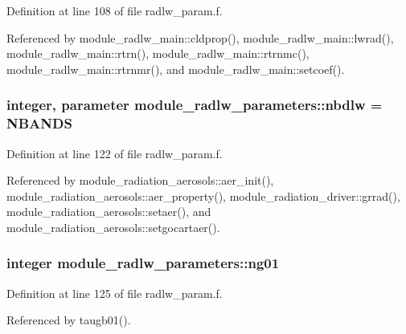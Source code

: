 Definition at line 108 of file radlw\+\_\+param.\+f.



Referenced by module\+\_\+radlw\+\_\+main\+::cldprop(), module\+\_\+radlw\+\_\+main\+::lwrad(), module\+\_\+radlw\+\_\+main\+::rtrn(), module\+\_\+radlw\+\_\+main\+::rtrnmc(), module\+\_\+radlw\+\_\+main\+::rtrnmr(), and module\+\_\+radlw\+\_\+main\+::setcoef().

\subsubsection[{\texorpdfstring{nbdlw}{nbdlw}}]{\setlength{\rightskip}{0pt plus 5cm}integer, parameter module\+\_\+radlw\+\_\+parameters\+::nbdlw = N\+B\+A\+N\+DS}\hypertarget{namespacemodule__radlw__parameters_a39a115a97296886b2e6e37b220e942c7}{}\label{namespacemodule__radlw__parameters_a39a115a97296886b2e6e37b220e942c7}


Definition at line 122 of file radlw\+\_\+param.\+f.



Referenced by module\+\_\+radiation\+\_\+aerosols\+::aer\+\_\+init(), module\+\_\+radiation\+\_\+aerosols\+::aer\+\_\+property(), module\+\_\+radiation\+\_\+driver\+::grrad(), module\+\_\+radiation\+\_\+aerosols\+::setaer(), and module\+\_\+radiation\+\_\+aerosols\+::setgocartaer().

\subsubsection[{\texorpdfstring{ng01}{ng01}}]{\setlength{\rightskip}{0pt plus 5cm}integer module\+\_\+radlw\+\_\+parameters\+::ng01}\hypertarget{namespacemodule__radlw__parameters_a54dc7913677d754af2b7ece9732b1280}{}\label{namespacemodule__radlw__parameters_a54dc7913677d754af2b7ece9732b1280}


Definition at line 125 of file radlw\+\_\+param.\+f.



Referenced by taugb01().

